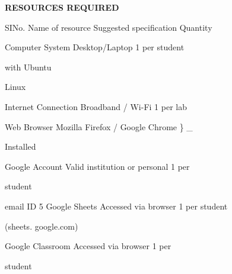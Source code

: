 \documentclass[10pt,a4paper]{article}
\begin{document}
\medskip\noindent\textbf{RESOURCES REQUIRED}\par
\noindent SINo. Name of resource Suggested specification Quantity\par

                                      Computer System Desktop/Laptop    1 per student\par
\noindent with Ubuntu\par

\noindent Linux\par

                                                      Internet Connection Broadband / Wi-Fi 1 per lab\par

                                                      Web Browser Mozilla Firefox / Google Chrome \} \_\par
\noindent Installed\par

                                                      Google Account Valid institution or personal 1 per\par
\noindent student\par

\noindent email ID 5                                             Google Sheets Accessed via browser 1 per student\par
\noindent (sheets. google.com)\par

                                                      Google Classroom Accessed via browser 1 per\par
\noindent student\par
\end{document}

